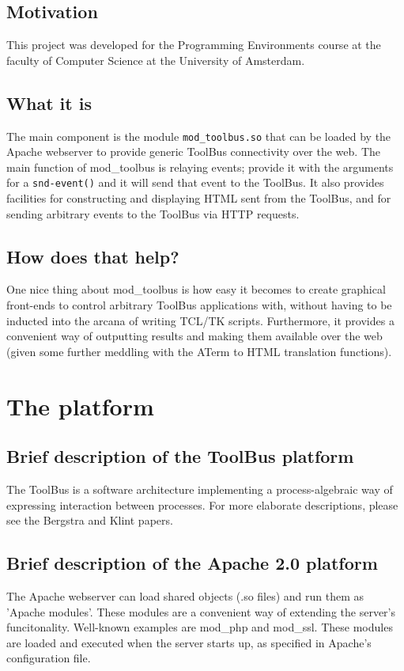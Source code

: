 \documentclass[a4paper,10pt]{article}
\begin{document}
\subsection{Motivation}
This project was developed for the Programming Environments course at the faculty of Computer Science at the University of Amsterdam.

\subsection{What it is}
The main component is the module \texttt{mod\_toolbus.so} that can be loaded by the Apache webserver to provide generic ToolBus connectivity over the web. The main function of mod\_toolbus is relaying events; provide it with the arguments for a \texttt{snd-event()} and it will send that event to the ToolBus. It also provides facilities for constructing and displaying HTML sent from the ToolBus, and for sending arbitrary events to the ToolBus via HTTP requests.


\subsection{How does that help?}
One nice thing about mod\_toolbus is how easy it becomes to create graphical front-ends to control arbitrary ToolBus applications with, without having to be inducted into the arcana of writing TCL/TK scripts. Furthermore, it provides a convenient way of outputting results and making them available over the web (given some further meddling with the ATerm to HTML translation functions).

\section{The platform}
\subsection{Brief description of the ToolBus platform}
The ToolBus is a software architecture implementing a process-algebraic way of expressing interaction between processes. For more elaborate descriptions, please see the Bergstra and Klint papers.

\subsection{Brief description of the Apache 2.0 platform}
The Apache webserver can load shared objects (.so files) and run them as 'Apache modules'. These modules are a convenient way of extending the server's funcitonality. Well-known examples are mod\_php and mod\_ssl. These modules are loaded and executed when the server starts up, as specified in Apache's configuration file.
\end{document}

